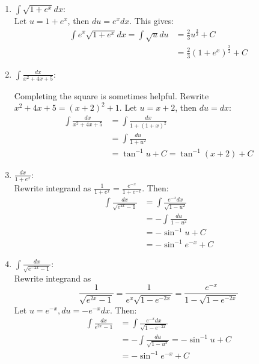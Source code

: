 \documentclass[11pt]{article}
\theoremstyle{plain}
\theoremstyle{remark}
\theoremstyle{plain}
\begin{document}
\begin{tcolorbox}[colback=magenta!5!white,colframe=magenta!75!black,title=Problem 2 ]
    \begin{enumerate}
        \item $\int\sqrt{1+e^x}dx$: \\ 
        Let $u=1+e^x$, then $du=e^xdx$. This gives:
        \begin{align*}
            \int e^x\sqrt{1+e^x}dx = \int\sqrt{u}du&=\frac{2}{3}u^{\frac{3}{2}}+C\\
            &=\frac{2}{3}(1+e^x)^{\frac{3}{2}}+C
        \end{align*}
        \item $\int\frac{dx}{x^2+4x+5}$: 
        
        Completing the square is sometimes helpful. Rewrite $x^2+4x+5=(x+2)^2+1$. Let $u=x+2$, then $du=dx$:
        \begin{align*}
            \int\frac{dx}{x^2+4x+5}&=\int \frac{dx}{1+(1+x)^2} \\
            &=\int\frac{du}{1+u^2}\\
            &=\tan^{-1}u+C = \tan^{-1}(x+2)+C
        \end{align*}

        \item $\frac{dx}{1+e^x}$: \\
        Rewrite integrand as $\frac{1}{1+e^x}=\frac{e^{-x}}{1+e^{-x}}$. Then:
        \begin{align*}
            \int\frac{dx}{\sqrt{e^{2x}-1}}&=\int\frac{e^{-x}dx}{\sqrt{1-u^2}}\\
            &=-\int\frac{du}{1-u^2}\\
            &=-\sin^{-1}u+C\\
            &=-\sin^{-1}e^{-x}+C
        \end{align*}

        \item $\int\frac{dx}{\sqrt{e^{-2x}-1}}$:\\
        Rewrite integrand as \[\frac{1}{\sqrt{e^{2x}-1}}=\frac{1}{e^x\sqrt{1-e^{-2x}}}=\frac{e^{-x}}{1-\sqrt{1-e^{-2x}}}\] Let $u=e^{-x}, du=-e^{-x}dx$. Then:
        \begin{align*}
            \int\frac{dx}{e^{2x}-1}&=\int\frac{e^{-x}dx}{\sqrt{1-e^{-2x}}}\\
            &=-\int\frac{du}{\sqrt{1-u^2}}=-\sin^{-1}u+C \\&= -\sin^{-1}e^{-x}+C
        \end{align*}
    \end{enumerate}
\end{tcolorbox}   
\end{document}

